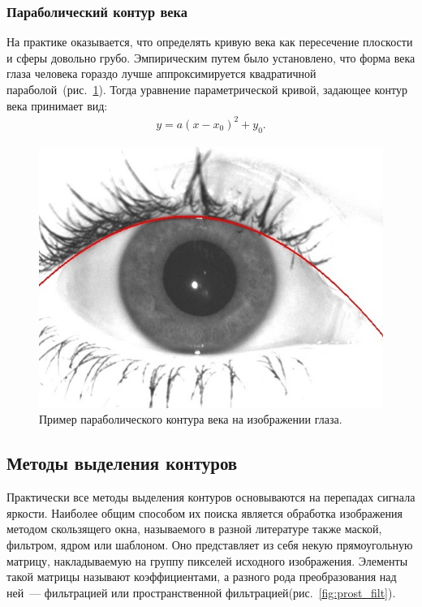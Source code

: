 \documentclass[12pt,a4paper]{article} %
\begin{document}
\subsubsection{Параболический контур века}

На практике оказывается, что определять кривую века как пересечение плоскости и сферы довольно грубо. Эмпирическим путем было установлено, что форма века глаза человека гораздо лучше аппроксимируется квадратичной параболой~(рис.~\ref{fig:glaz5}). Тогда уравнение параметрической кривой, задающее контур века принимает вид:
\begin{gather}\label{par1}
	y = a(x-x_0)^2 + y_0.
\end{gather}

\begin{figure}[h]
	
	\centering
	
	\includegraphics[width=0.5\linewidth]{glaz5.jpg}
	
	\caption{Пример параболического контура века на изображении глаза.}
	
	\label{fig:glaz5}
	
\end{figure}

\newpage
\subsection{Методы выделения контуров}

Практически все методы выделения контуров основываются на перепадах сигнала яркости. Наиболее общим способом их поиска является обработка изображения методом скользящего окна, называемого в разной литературе также маской, фильтром, ядром или шаблоном. Оно представляет из себя некую прямоугольную матрицу, накладываемую на группу пикселей исходного изображения. Элементы такой матрицы называют коэффициентами, а разного рода преобразования над ней~--- фильтрацией или пространственной фильтрацией(рис.~\ref{fig:prost_filt}).
\end{document}
